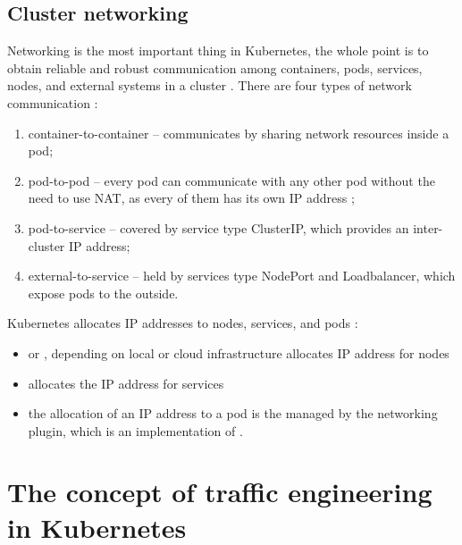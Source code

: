 


\subsection{Cluster networking}
\label{sec:k8s_networking}

Networking is the most important thing in Kubernetes, the whole point is to obtain reliable and robust communication among containers, pods, services, nodes, and external systems in a cluster \cite{KubernetesDocs}. There are four types of network communication \cite{KubernetesDocs}:

\begin{enumerate}
    \item container-to-container -- communicates by sharing network resources inside a pod;
    \item pod-to-pod -- every pod can communicate with any other pod without the need to use NAT, as every of them has its own IP address \cite{IBMKubernetesNetworking};
    \item pod-to-service -- covered by service type ClusterIP, which provides an inter-cluster IP address;
    \item external-to-service -- held by services type NodePort and Loadbalancer, which expose pods to the outside.
\end{enumerate}
Kubernetes allocates IP addresses to nodes, services, and pods \cite{KubernetesDocs}:
\begin{itemize}
    \item \textit{} or \textit{}, depending on local or cloud infrastructure allocates IP address for nodes
    \item \textit{} allocates the IP address for services
    \item the allocation of an IP address to a pod is the managed by the networking plugin, which is an implementation of \textit{}.
\end{itemize}



\section{The concept of traffic engineering in Kubernetes}
\label{sec:trafficConcept}

